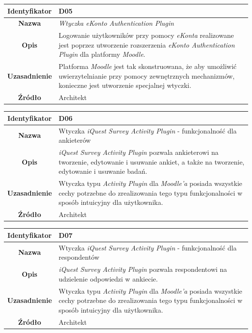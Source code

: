 \begin{table}[H]
\centering
\begin{tabular}{ | >{\bfseries}c | p{11cm} | }
\hline
%
Identyfikator & D05 \\ \hline
Nazwa & \textit{Wtyczka eKonto Authentication Plugin}  \\ \hline
Opis & Logowanie użytkowników przy pomocy \textit{eKonta} realizowane jest poprzez utworzenie rozszerzenia \textit{eKonto Authentication Plugin} dla platformy \textit{Moodle}. \\ \hline
Uzasadnienie & Platforma \textit{Moodle} jest tak skonstruowana, że aby umożliwić uwierzytelnianie przy pomocy zewnętrznych mechanizmów, konieczne jest utworzenie specjalnej wtyczki. \\ \hline
Źródło & Architekt \\ \hline
%
\end{tabular}
\end{table}

\begin{table}[H]
\centering
\begin{tabular}{ | >{\bfseries}c | p{11cm} | }
\hline
%
Identyfikator & D06 \\ \hline
Nazwa & Wtyczka \textit{iQuest Survey Activity Plugin} - funkcjonalność dla ankieterów  \\ \hline
Opis & \textit{iQuest Survey Activity Plugin} pozwala ankieterowi na tworzenie, edytowanie i usuwanie ankiet, a także na tworzenie, edytowanie i usuwanie badań. \\ \hline
Uzasadnienie & Wtyczka typu \textit{Activity Plugin} dla \textit{Moodle'a} posiada wszystkie cechy potrzebne do zrealizowania tego typu funkcjonalności w sposób intuicyjny dla użytkownika. \\ \hline
Źródło & Architekt \\ \hline
%
\end{tabular}
\end{table}

\begin{table}[H]
\centering
\begin{tabular}{ | >{\bfseries}c | p{11cm} | }
\hline
%
Identyfikator & D07 \\ \hline
Nazwa & Wtyczka \textit{iQuest Survey Activity Plugin} - funkcjonalność dla respondentów \\ \hline
Opis & \textit{iQuest Survey Activity Plugin} pozwala respondentowi na udzielenie odpowiedzi w ankiecie. \\ \hline
Uzasadnienie & Wtyczka typu \textit{Activity Plugin} dla \textit{Moodle'a} posiada wszystkie cechy potrzebne do zrealizowania tego typu funkcjonalności w sposób intuicyjny dla użytkownika. \\ \hline
Źródło & Architekt \\ \hline
%
\end{tabular}
\end{table}


